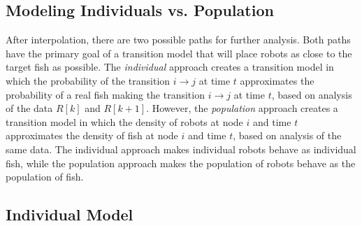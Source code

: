 \documentclass[11pt,letterpaper]{article}
\begin{document}
	\subsection{Modeling Individuals vs. Population}
	
	After interpolation, there are two possible paths for further analysis. Both paths have the primary goal of a transition model that will place robots as close to the target fish as possible. The \textit{individual} approach creates a transition model in which the probability of the transition $i \rightarrow j$ at time $t$ approximates the probability of a real fish making the transition $i \rightarrow j$ at time $t$, based on analysis of the data $R[k]$ and $R[k + 1]$. However, the \textit{population} approach creates a transition model in which the density of robots at node $i$ and time $t$ approximates the density of fish at node $i$ and time $t$, based on analysis of the same data. The individual approach makes individual robots behave as individual fish, while the population approach makes the population of robots behave as the population of fish. 
	
	\subsection{Individual Model}
	
\end{document}
